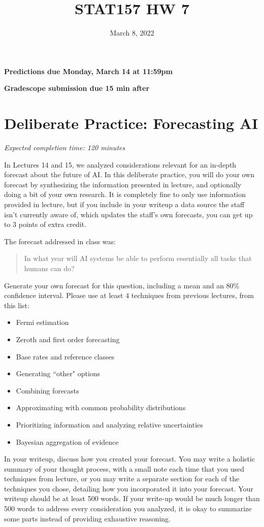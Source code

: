 \documentclass[11pt]{article}
\title{STAT157 HW 7}
\date{March 8, 2022}
\begin{document}
\maketitle

\hfill \textbf{Predictions due Monday, March 14 at 11:59pm}

\hfill \textbf{Gradescope submission due 15 min after}


\section*{Deliberate Practice: Forecasting AI}

\emph{Expected completion time: 120 minutes}

In Lectures 14 and 15, we analyzed considerations relevant for an in-depth forecast about the future of AI. In this deliberate practice, you will do your own forecast by synthesizing the information presented in lecture, and optionally doing a bit of your own research. It is completely fine to only use information provided in lecture, but if you include in your writeup a data source the staff isn't currently aware of, which updates the staff's own forecasts, you can get up to 3 points of extra credit.


The forecast addressed in class was:
\begin{quote}
	In what year will AI systems be able to perform essentially all tasks that humans can do?
\end{quote}
Generate your own forecast for this question, including a mean and an 80\% confidence interval. Please use at least 4 techniques from previous lectures, from this list:
\begin{itemize}
	\item Fermi estimation
	\item Zeroth and first order forecasting
	\item Base rates and reference classes
	\item Generating ``other" options
	\item Combining forecasts
	\item Approximating with common probability distributions
	\item Prioritizing information and analyzing relative uncertainties
	\item Bayesian aggregation of evidence
\end{itemize}

In your writeup, discuss how you created your forecast. You may write a holistic summary of your thought process, with a small note each time that you used techniques from lecture, or you may write a separate section for each of the techniques you chose, detailing how you incorporated it into your forecast. Your writeup should be at least 500 words. If your write-up would be much longer than 500 words to address every consideration you analyzed, it is okay to summarize some parts instead of providing exhaustive reasoning.
\end{document}
